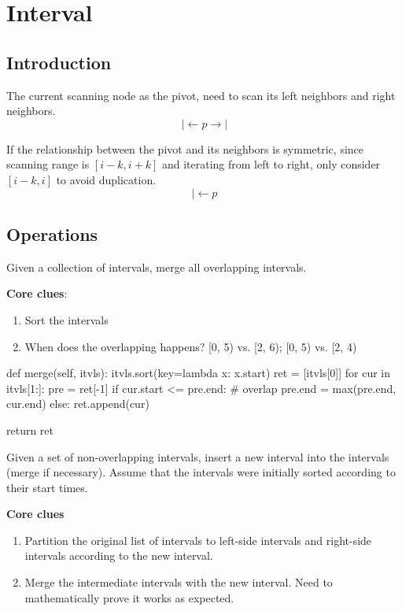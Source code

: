 \chapter{Interval}


\section{Introduction}
 The current scanning node as the pivot, need to scan its left neighbors and right neighbors. 
$$
|\leftarrow p \rightarrow |
$$

If the relationship between the pivot and its neighbors is symmetric, since scanning range is $[i-k, i+k]$ and iterating from left to right, only consider $[i-k, i]$ to avoid duplication.
$$
|\leftarrow p
$$

\section{Operations}
 Given a collection of intervals, merge all overlapping intervals.

\textbf{Core clues}:
\begin{enumerate}
\item Sort the intervals
\item When does the overlapping happens?
[0, 5) vs. [2, 6); [0, 5) vs. [2, 4)
\end{enumerate}
\begin{python}
def merge(self, itvls):
    itvls.sort(key=lambda x: x.start)
    ret = [itvls[0]]
    for cur in itvls[1:]:
        pre = ret[-1]
        if cur.start <= pre.end:  # overlap
            pre.end = max(pre.end, cur.end)
        else:
            ret.append(cur)

    return ret
\end{python}

 Given a set of non-overlapping intervals, insert a new interval into the intervals (merge if necessary). Assume that the intervals were initially sorted according to their start times.

\textbf{Core clues}
\begin{enumerate}
\item Partition the original list of intervals to left-side intervals and right-side intervals according to the new interval. 
\item Merge the intermediate intervals with the new interval. Need to mathematically prove it works as expected.
\end{enumerate}

